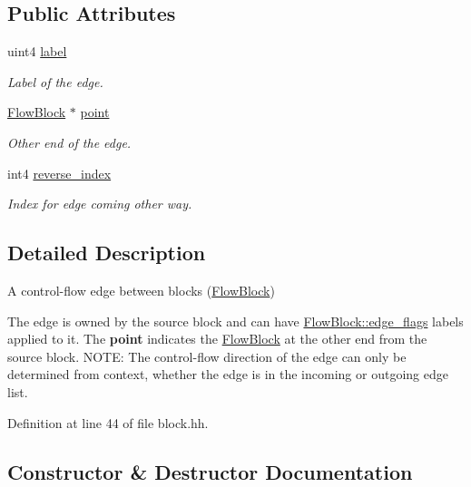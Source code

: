 \subsection*{Public Attributes}
\begin{DoxyCompactItemize}
\item 
uint4 \mbox{\hyperlink{struct_block_edge_a8e5e3a0500c81abaa9fcaf1360227076}{label}}
\begin{DoxyCompactList}\small\item\em Label of the edge. \end{DoxyCompactList}\item 
\mbox{\hyperlink{class_flow_block}{Flow\+Block}} $\ast$ \mbox{\hyperlink{struct_block_edge_a993d5aa765b4ffd516f8e59cefbbe470}{point}}
\begin{DoxyCompactList}\small\item\em Other end of the edge. \end{DoxyCompactList}\item 
int4 \mbox{\hyperlink{struct_block_edge_aa4ed5e4c15bd9596cd02347a8c7c9d9f}{reverse\+\_\+index}}
\begin{DoxyCompactList}\small\item\em Index for edge coming other way. \end{DoxyCompactList}\end{DoxyCompactItemize}


\subsection{Detailed Description}
A control-\/flow edge between blocks (\mbox{\hyperlink{class_flow_block}{Flow\+Block}}) 

The edge is owned by the source block and can have \mbox{\hyperlink{class_flow_block_a8e0a775040ad0bd333cf48957b81f9d3}{Flow\+Block\+::edge\+\_\+flags}} labels applied to it. The {\bfseries{point}} indicates the \mbox{\hyperlink{class_flow_block}{Flow\+Block}} at the other end from the source block. N\+O\+TE\+: The control-\/flow direction of the edge can only be determined from context, whether the edge is in the incoming or outgoing edge list. 

Definition at line 44 of file block.\+hh.



\subsection{Constructor \& Destructor Documentation}
\mbox{\label{struct_block_edge_a6df7a3987c1be015a0ba41f3e6e90b3c}} 
